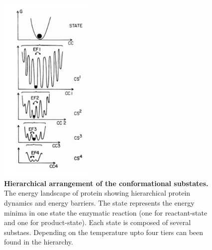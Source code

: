 \begin{figure} %
    \centering
    \includegraphics[width=0.4\textwidth]{energy_landscape}
    \caption{\textbf{Hierarchical arrangement of the conformational substates.} The energy landscape of protein showing hierarchical protein dynamics and energy barriers. The state represents the energy minima in one state the enzymatic reaction (one for reactant-state and one for product-state). Each state is composed of several substaes. Depending on the temperature upto four tiers can been found in the hierarchy.}
    \label{fig:energy_landscape}
\end{figure}

